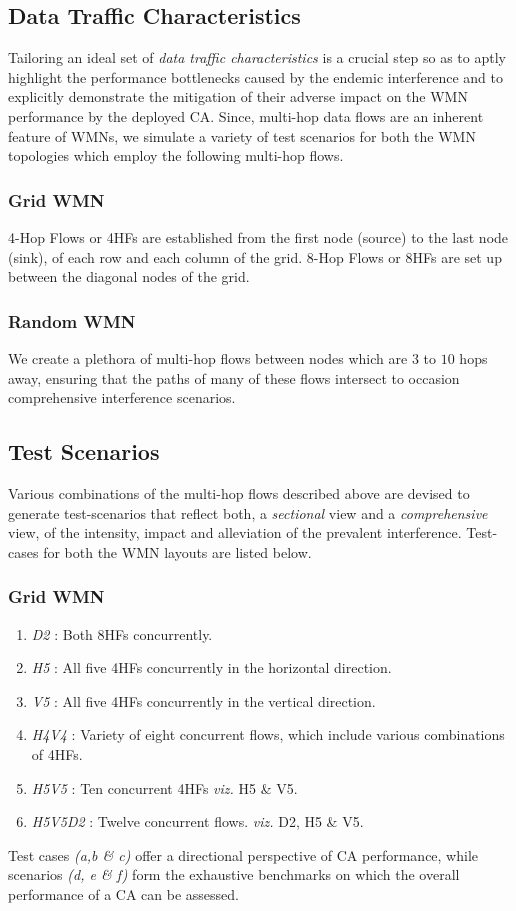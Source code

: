 \documentclass[conference]{IEEEtran}
\begin{document}
\subsection{Data Traffic Characteristics}
Tailoring an ideal set of \textit{data traffic characteristics} is a crucial step so as to aptly highlight the performance bottlenecks caused by the endemic interference and to explicitly demonstrate the mitigation of their adverse impact on the WMN performance by the deployed CA. 
Since, multi-hop data flows are an inherent feature of WMNs, we simulate a variety of test scenarios for both the WMN topologies which employ the following multi-hop flows.
\subsubsection {Grid WMN} 4-Hop Flows or 4HFs are established from the first node (source) to the last node (sink), of each row and each column of the grid. 8-Hop Flows or 8HFs are set up between the diagonal nodes of the grid.  
\subsubsection {Random WMN} We create a plethora of multi-hop flows between nodes which are $3$ to $10$ hops away, ensuring that the paths of many of these flows intersect to occasion comprehensive interference scenarios.

\subsection{Test Scenarios}
Various combinations of the multi-hop flows described above are devised to generate test-scenarios that reflect both, a \textit{sectional} view and a \textit{comprehensive} view, of the intensity, impact and alleviation of the prevalent interference. Test-cases for both the WMN layouts are listed below.
\subsubsection {Grid WMN}
\begin{enumerate}[label=(\alph*)]
 \item \textit{D2} : Both 8HFs  concurrently.
 \item \textit{H5} : All five 4HFs concurrently in the horizontal direction. 
 \item \textit{V5} : All five 4HFs concurrently in the vertical direction. 
\item \textit{H4V4} : Variety of eight concurrent flows, which include various combinations of 4HFs.
 \item \textit{H5V5} : Ten concurrent 4HFs \emph{viz.} H5 \& V5.
 \item \textit{H5V5D2} : Twelve concurrent flows. \emph{viz.} D2, H5 \& V5.
\end{enumerate}
Test cases \textit{(a,b \& c)} offer a directional perspective of CA performance, while scenarios \textit{(d, e \& f)} form the exhaustive benchmarks on which the overall performance of a CA can be assessed.  
\end{document}
